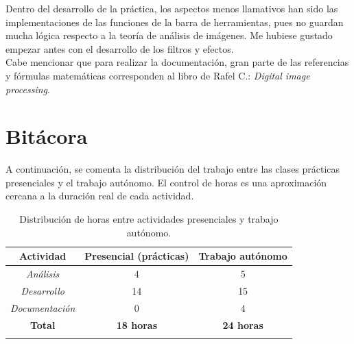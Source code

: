 \documentclass[11pt]{article}
\begin{document}
  Dentro del desarrollo de la práctica, los aspectos menos llamativos han sido
  las implementaciones de las funciones de la barra de herramientas, pues no
  guardan mucha lógica respecto a la teoría de análisis de imágenes. Me hubiese
  gustado empezar antes con el desarrollo de los filtros y efectos. \\

  Cabe mencionar que para realizar la documentación, gran parte de las
  referencias y fórmulas matemáticas corresponden al libro de Rafel C.:
  \textit{Digital image processing}.

\section{Bitácora}

  A continuación, se comenta la distribución del trabajo entre las clases
  prácticas presenciales y el trabajo autónomo. El control de horas es una
  aproximación cercana a la duración real de cada actividad.

  \setlength{\tabcolsep}{15pt} %
  \begin{table}[h]
      \centering
      \begin{tabular}{c c c}
          \hline
          \textbf{Actividad}     & \textbf{Presencial (prácticas)} & \textbf{Trabajo autónomo} \\
          \hline
          \textit{Análisis}      & 4                               & 5                         \\
          \textit{Desarrollo}    & 14                              & 15                        \\
          \textit{Documentación} & 0                               & 4                         \\
          \hline
          \textbf{Total}         & \textbf{18 horas}               & \textbf{24 horas}         \\
          \hline                                                                               \\
      \end{tabular}
      \caption{Distribución de horas entre actividades presenciales y trabajo autónomo.}
      \label{tab:distribucion-horas}
  \end{table}

  \clearpage

  
  

  \clearpage
\end{document}
